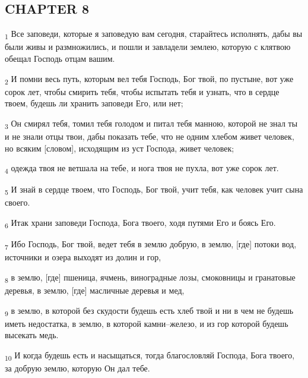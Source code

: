 \subsection{CHAPTER 8}
\begin{tcolorbox}
\textsubscript{1} Все заповеди, которые я заповедую вам сегодня, старайтесь исполнять, дабы вы были живы и размножились, и пошли и завладели землею, которую с клятвою обещал Господь отцам вашим.
\end{tcolorbox}
\begin{tcolorbox}
\textsubscript{2} И помни весь путь, которым вел тебя Господь, Бог твой, по пустыне, вот уже сорок лет, чтобы смирить тебя, чтобы испытать тебя и узнать, что в сердце твоем, будешь ли хранить заповеди Его, или нет;
\end{tcolorbox}
\begin{tcolorbox}
\textsubscript{3} Он смирял тебя, томил тебя голодом и питал тебя манною, которой не знал ты и не знали отцы твои, дабы показать тебе, что не одним хлебом живет человек, но всяким [словом], исходящим из уст Господа, живет человек;
\end{tcolorbox}
\begin{tcolorbox}
\textsubscript{4} одежда твоя не ветшала на тебе, и нога твоя не пухла, вот уже сорок лет.
\end{tcolorbox}
\begin{tcolorbox}
\textsubscript{5} И знай в сердце твоем, что Господь, Бог твой, учит тебя, как человек учит сына своего.
\end{tcolorbox}
\begin{tcolorbox}
\textsubscript{6} Итак храни заповеди Господа, Бога твоего, ходя путями Его и боясь Его.
\end{tcolorbox}
\begin{tcolorbox}
\textsubscript{7} Ибо Господь, Бог твой, ведет тебя в землю добрую, в землю, [где] потоки вод, источники и озера выходят из долин и гор,
\end{tcolorbox}
\begin{tcolorbox}
\textsubscript{8} в землю, [где] пшеница, ячмень, виноградные лозы, смоковницы и гранатовые деревья, в землю, [где] масличные деревья и мед,
\end{tcolorbox}
\begin{tcolorbox}
\textsubscript{9} в землю, в которой без скудости будешь есть хлеб твой и ни в чем не будешь иметь недостатка, в землю, в которой камни--железо, и из гор которой будешь высекать медь.
\end{tcolorbox}
\begin{tcolorbox}
\textsubscript{10} И когда будешь есть и насыщаться, тогда благословляй Господа, Бога твоего, за добрую землю, которую Он дал тебе.
\end{tcolorbox}
